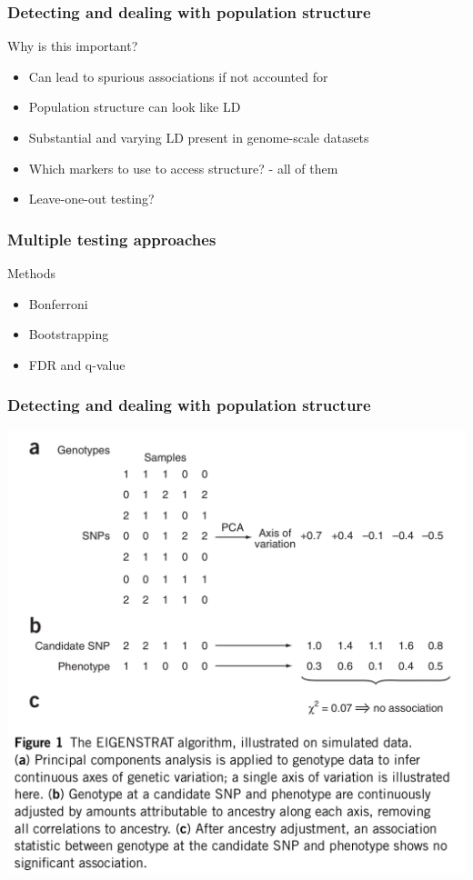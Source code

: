\begin{frame}
\frametitle{Detecting and dealing with population structure}
\begin{block}{Why is this important?}
\begin{itemize}
	\item{Can lead to spurious associations if not accounted for}
	\item{Population structure can look like LD}
	\item{Substantial and varying LD present in genome-scale datasets}
	\item{Which markers to use to access structure? - all of them}
	\item{Leave-one-out testing?}
\end{itemize}
\end{block}
\tiny
\citet{Price:2006cd}
\end{frame}

\begin{frame}
\frametitle{Multiple testing approaches}
\begin{block}{Methods}
\begin{itemize}
	\item Bonferroni
	\item Bootstrapping
	\item FDR and q-value \citep{Storey:2003wo, BENJAMINI:1995ws}
\end{itemize}
\end{block}
\end{frame}

\begin{frame}
\frametitle{Detecting and dealing with population structure}
\begin{block}{}
\centering
\includegraphics[height=0.8\textheight]{price.png}\\
\tiny
\citet[Figure 1]{Price:2006cd}
\end{block}
\end{frame}

